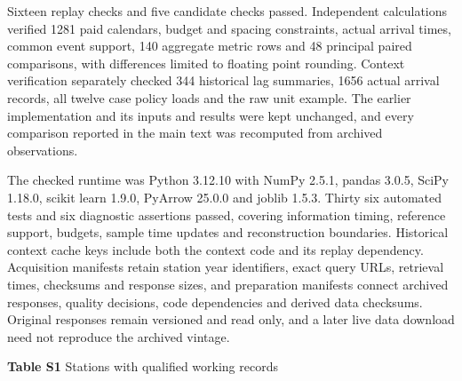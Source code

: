 \documentclass[lineno,pdflatex,sn-apa]{sn-jnl}%
\theoremstyle{thmstyleone}%
\theoremstyle{thmstyletwo}%
\theoremstyle{thmstylethree}%
\begin{document}
Sixteen replay checks and five candidate checks passed. Independent calculations verified 1281 paid calendars, budget and spacing constraints, actual arrival times, common event support, 140 aggregate metric rows and 48 principal paired comparisons, with differences limited to floating point rounding. Context verification separately checked 344 historical lag summaries, 1656 actual arrival records, all twelve case policy loads and the raw unit example. The earlier implementation and its inputs and results were kept unchanged, and every comparison reported in the main text was recomputed from archived observations.

The checked runtime was Python 3.12.10 with NumPy 2.5.1, pandas 3.0.5, SciPy 1.18.0, scikit learn 1.9.0, PyArrow 25.0.0 and joblib 1.5.3. Thirty six automated tests and six diagnostic assertions passed, covering information timing, reference support, budgets, sample time updates and reconstruction boundaries. Historical context cache keys include both the context code and its replay dependency. Acquisition manifests retain station year identifiers, exact query URLs, retrieval times, checksums and response sizes, and preparation manifests connect archived responses, quality decisions, code dependencies and derived data checksums. Original responses remain versioned and read only, and a later live data download need not reproduce the archived vintage.

\begin{center}
\noindent\textbf{Table S1} Stations with qualified working records
\end{center}
\end{document}
